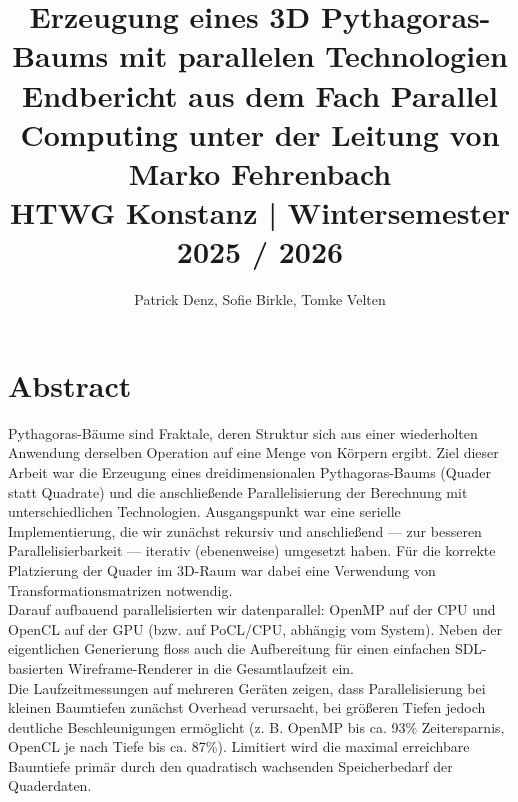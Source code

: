\documentclass[11pt]{report}
\title{Erzeugung eines 3D Pythagoras-Baums mit parallelen Technologien\\
        \large{Endbericht aus dem Fach Parallel Computing unter der Leitung von Marko Fehrenbach\\
                HTWG Konstanz | Wintersemester 2025 / 2026}
}
\author{Patrick Denz, Sofie Birkle, Tomke Velten}
\begin{document}
\renewcommand{\figurename}{Abb.} %


\centering
\section*{Abstract}
Pythagoras-Bäume sind Fraktale, deren Struktur sich aus einer wiederholten Anwendung derselben Operation auf eine Menge von Körpern ergibt. 
Ziel dieser Arbeit war die Erzeugung eines dreidimensionalen Pythagoras-Baums (Quader statt Quadrate) und die anschließende Parallelisierung der Berechnung mit 
unterschiedlichen Technologien. Ausgangspunkt war eine serielle Implementierung, die wir zunächst rekursiv und anschließend — zur besseren Parallelisierbarkeit
— iterativ (ebenenweise) umgesetzt haben. Für die korrekte Platzierung der Quader im 3D-Raum war dabei eine Verwendung von Transformationsmatrizen notwendig. \\

Darauf aufbauend parallelisierten wir datenparallel: OpenMP auf der CPU und OpenCL auf der GPU (bzw. auf PoCL/CPU, abhängig vom System). Neben der eigentlichen 
Generierung floss auch die Aufbereitung für einen einfachen SDL-basierten Wireframe-Renderer in die Gesamtlaufzeit ein. \\

Die Laufzeitmessungen auf mehreren Geräten zeigen, dass Parallelisierung bei kleinen Baumtiefen zunächst Overhead verursacht, bei größeren Tiefen jedoch deutliche 
Beschleunigungen ermöglicht (z. B. OpenMP bis ca. 93\% Zeitersparnis, OpenCL je nach Tiefe bis ca. 87\%). Limitiert wird die maximal erreichbare Baumtiefe primär durch 
den quadratisch wachsenden Speicherbedarf der Quaderdaten.

\raggedright
\tableofcontents
\newpage

\setcounter{secnumdepth}{2} %
\renewcommand\thesection{\arabic{section}} %
\renewcommand\thesubsection{\arabic{section}.\arabic{subsection}} %

\setcounter{section}{-1} %


\newpage

\newpage


\newpage


\newpage

\end{document}
